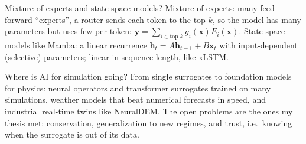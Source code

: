 \begin{qabox}[general]{\pred Mixture of experts and state space models?}
\ans Mixture of experts: many feed-forward ``experts'', a router sends each token to the top-$k$,
so the model has many parameters but uses few per token:
$\mathbf{y}=\sum_{i\in\text{top-}k}g_i(\mathbf{x})E_i(\mathbf{x})$. State space models like Mamba:
a linear recurrence $\mathbf{h}_t=\bar A\mathbf{h}_{t-1}+\bar B\mathbf{x}_t$ with input-dependent
(selective) parameters; linear in sequence length, like xLSTM.
\end{qabox}

\begin{qabox}{\pred Where is AI for simulation going?}
\ans From single surrogates to foundation models for physics: neural operators and transformer
surrogates trained on many simulations, weather models that beat numerical forecasts in speed,
and industrial real-time twins like NeuralDEM. The open problems are the ones my thesis met:
conservation, generalization to new regimes, and trust, i.e.\ knowing when the surrogate is out of
its data.
\end{qabox}

